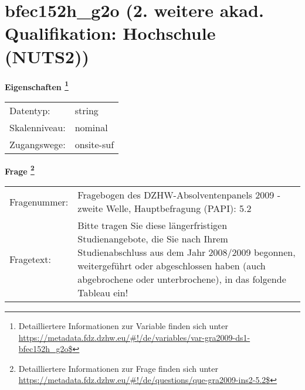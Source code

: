 
    \setcounter{footnote}{0}

    \vspace*{-1.8cm}
	\section{bfec152h\_g2o (2. weitere akad. Qualifikation: Hochschule (NUTS2))}
	\label{section:bfec152h_g2o}



    \vspace*{0.5cm}
    \noindent\textbf{Eigenschaften
	\footnote{Detailliertere Informationen zur Variable finden sich unter
		\url{https://metadata.fdz.dzhw.eu/\#!/de/variables/var-gra2009-ds1-bfec152h_g2o$}}}\\
	\begin{tabularx}{\hsize}{@{}lX}
	Datentyp: & string \\
	Skalenniveau: & nominal \\
	Zugangswege: &
	  onsite-suf
 \\
    \end{tabularx}



				\vspace*{0.5cm}
                \noindent\textbf{Frage
	                \footnote{Detailliertere Informationen zur Frage finden sich unter
		              \url{https://metadata.fdz.dzhw.eu/\#!/de/questions/que-gra2009-ins2-5.2$}}}\\
				\begin{tabularx}{\hsize}{@{}lX}
					Fragenummer: &
					  Fragebogen des DZHW-Absolventenpanels 2009 - zweite Welle, Hauptbefragung (PAPI):
					  5.2
 \\
					Fragetext: & Bitte tragen Sie diese längerfristigen Studienangebote, die Sie nach Ihrem Studienabschluss aus dem Jahr 2008/2009 begonnen, weitergeführt oder abgeschlossen haben (auch abgebrochene oder unterbrochene), in das folgende Tableau ein! \\
				\end{tabularx}





